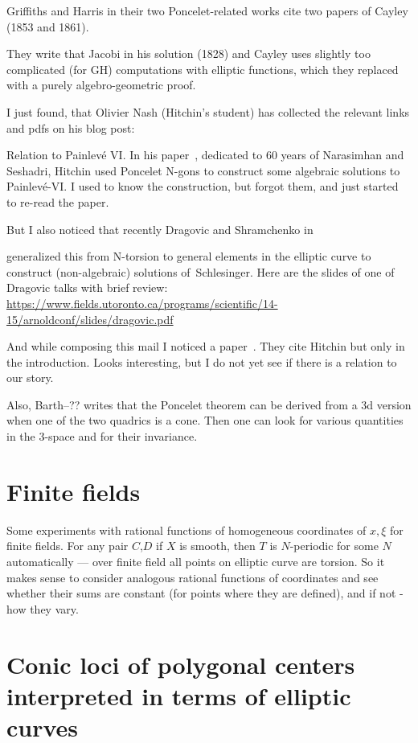 \documentclass[12pt]{article}
\numberwithin{equation}{section}
\begin{document}
Griffiths and Harris in their two Poncelet-related works \cite{GH1977,GH1978}
cite two papers of Cayley (1853 and 1861).

They write that Jacobi in his solution (1828) 
and Cayley uses slightly too complicated (for GH) 
computations with elliptic functions, 
which they replaced with a purely algebro-geometric proof.

I just found, that Olivier Nash (Hitchin's student) has collected the relevant links and pdfs on his blog post:
\cite{Nash2018,Cayley1853,Cayley1861}

Relation to Painlevé VI. 
In his paper \cite{Hitchin1992},
dedicated to 60 years of Narasimhan and Seshadri,
Hitchin used Poncelet N-gons to construct some algebraic solutions to Painlevé-VI.
I used to know the construction, but forgot them, and just started to re-read the paper.

But I also noticed that recently 
Dragovic and Shramchenko in \cite{DS2019}

generalized this from N-torsion to general elements 
in the elliptic curve to construct 
(non-algebraic) solutions of Schlesinger.
Here are the slides of one of Dragovic talks with brief review:   
\url{https://www.fields.utoronto.ca/programs/scientific/14-15/arnoldconf/slides/dragovic.pdf}


And while composing this mail I noticed a paper \cite{IU2007}.
They cite Hitchin but only in the introduction. 
Looks interesting, but I do not yet see if there is a relation to our story.


Also, Barth--?? writes that 
the Poncelet theorem can be derived 
from a 3d version 
when one of the two quadrics is a cone.
Then one can look for various quantities 
in the 3-space and for their invariance.


\section{Finite fields}

Some experiments with rational functions of homogeneous coordinates of $x,ξ$ for finite fields.
For any pair $C$,$D$ if $X$ is smooth, then $T$ is $N$-periodic for some $N$ automatically ---
over finite field all points on elliptic curve are torsion.
So it makes sense to consider analogous rational functions of coordinates and see whether
their sums are constant (for points where they are defined), and if not - how they vary.

\section{Conic loci of polygonal centers interpreted in terms of elliptic curves}
\end{document}
